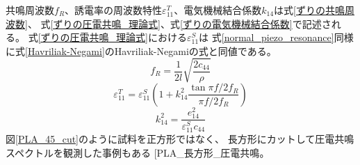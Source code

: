 \documentclass[dvipdfmx,12pt,a4paper]{jreport}
\makeatletter
\DeclareRobustCommand\cite{\unskip
    	\@ifnextchar[{\@tempswatrue\@citex}{\@tempswafalse\@citex[]}}
\makeatother
\begin{document}
			共鳴周波数$f_R$、誘電率の周波数特性$\varepsilon_{11}^T$、電気機械結合係数$k_{14}$は式\ref{ずりの共鳴周波数}、
			式\ref{ずりの圧電共鳴_理論式}、式\ref{ずりの電気機械結合係数}で記述される。
			式\ref{ずりの圧電共鳴_理論式}における$\varepsilon_{11}^S$は
			式\ref{normal_piezo_resonance}同様に式\ref{Havriliak-Negami}のHavriliak-Negamiの式と同値である。
			\begin{equation}
				f_R = \frac{1}{2l}\sqrt{\frac{2c_{44}}{\rho}}
				\label{ずりの共鳴周波数}
			\end{equation}
			\begin{equation}
				\varepsilon_{11}^T=\varepsilon_{11}^S\left(1+k_{14}^2\frac{\tan{\pi f/2f_R}}{\pi f/2f_R}\right)
				\label{ずりの圧電共鳴_理論式}
			\end{equation}
			\begin{equation}
				k_{14}^2=\frac{e_{14}^2}{\varepsilon_{11}^Sc_{44}}
				\label{ずりの電気機械結合係数}
			\end{equation}
			図\ref{PLA_45_cut}のように試料を正方形ではなく、
			長方形にカットして圧電共鳴スペクトルを観測した事例もある
			\cite{PLA_長方形_圧電共鳴}。
\end{document}
